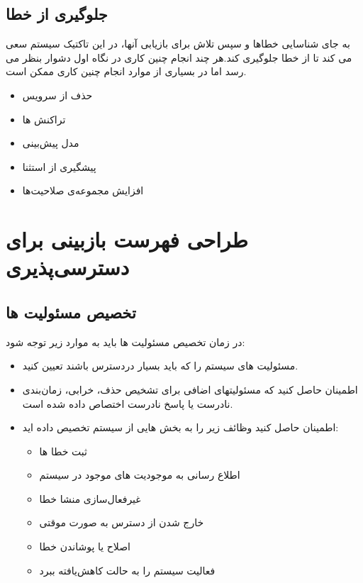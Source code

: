 \subsection{جلوگیری از خطا}
به جای شناسایی خطاها و سپس تلاش برای بازیابی آنها، در این تاکتیک سیستم سعی می کند تا از خطا جلوگیری کند.هر چند انجام چنین کاری در نگاه اول دشوار بنظر می رسد اما در بسیاری از موارد انجام چنین کاری ممکن است.
\begin{itemize}
\item 
حذف از سرویس 
\item
تراکنش ها 
\item
مدل پیش‌بینی 
\item
پیشگیری از استثنا 
\item
افزایش مجموعه‌ی صلاحیت‌ها 
\end{itemize}

\section{طراحی فهرست بازبینی برای دسترسی‌پذیری}
\subsection{تخصیص مسئولیت ها} 
در زمان تخصیص مسئولیت ها باید  به موارد زیر توجه شود:
\begin{itemize}
\item
مسئولیت های سیستم را که باید بسیار در‌دسترس باشند تعیین کنید.
\item
اطمینان حاصل کنید که مسئولیتهای اضافی برای تشخیص حذف، خرابی، زمان‌بندی نادرست یا پاسخ نادرست اختصاص داده شده است.
\item
اطمینان حاصل کنید وظائف زیر را به بخش هایی از سیستم تخصیص داده اید:
\begin{itemize}
\item
ثبت خطا ها
\item
اطلاع رسانی به موجودیت های موجود در سیستم
\item
غیر‌فعال‌سازی منشا خطا
\item
خارج شدن از دسترس به صورت موقتی
\item
اصلاح یا پوشاندن خطا
\item
فعالیت سیستم را به حالت کاهش‌یافته  ببرد
\end{itemize}
\end{itemize}

